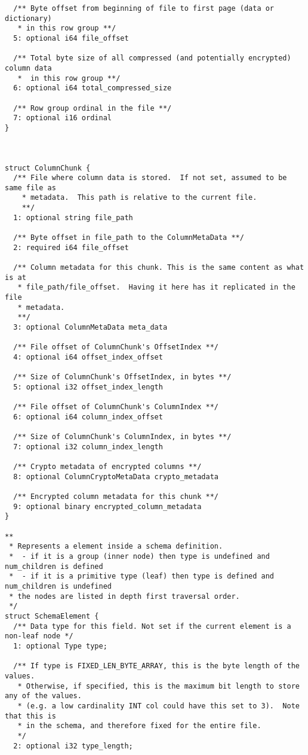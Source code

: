 \documentclass[manuscript]{acmart}
\begin{document}
\begin{verbatim}
  /** Byte offset from beginning of file to first page (data or dictionary)
   * in this row group **/
  5: optional i64 file_offset

  /** Total byte size of all compressed (and potentially encrypted) column data
   *  in this row group **/
  6: optional i64 total_compressed_size

  /** Row group ordinal in the file **/
  7: optional i16 ordinal
}



struct ColumnChunk {
  /** File where column data is stored.  If not set, assumed to be same file as
    * metadata.  This path is relative to the current file.
    **/
  1: optional string file_path

  /** Byte offset in file_path to the ColumnMetaData **/
  2: required i64 file_offset

  /** Column metadata for this chunk. This is the same content as what is at
   * file_path/file_offset.  Having it here has it replicated in the file
   * metadata.
   **/
  3: optional ColumnMetaData meta_data

  /** File offset of ColumnChunk's OffsetIndex **/
  4: optional i64 offset_index_offset

  /** Size of ColumnChunk's OffsetIndex, in bytes **/
  5: optional i32 offset_index_length

  /** File offset of ColumnChunk's ColumnIndex **/
  6: optional i64 column_index_offset

  /** Size of ColumnChunk's ColumnIndex, in bytes **/
  7: optional i32 column_index_length

  /** Crypto metadata of encrypted columns **/
  8: optional ColumnCryptoMetaData crypto_metadata

  /** Encrypted column metadata for this chunk **/
  9: optional binary encrypted_column_metadata
}

**
 * Represents a element inside a schema definition.
 *  - if it is a group (inner node) then type is undefined and num_children is defined
 *  - if it is a primitive type (leaf) then type is defined and num_children is undefined
 * the nodes are listed in depth first traversal order.
 */
struct SchemaElement {
  /** Data type for this field. Not set if the current element is a non-leaf node */
  1: optional Type type;

  /** If type is FIXED_LEN_BYTE_ARRAY, this is the byte length of the values.
   * Otherwise, if specified, this is the maximum bit length to store any of the values.
   * (e.g. a low cardinality INT col could have this set to 3).  Note that this is
   * in the schema, and therefore fixed for the entire file.
   */
  2: optional i32 type_length;


\end{verbatim}
\end{document}
